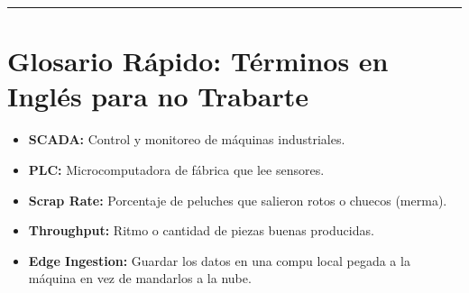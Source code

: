 \documentclass[10pt,letterpaper]{article}
\begin{document}
\vspace{0.2cm}
\rule{\textwidth}{0.8pt}

\section*{Glosario Rápido: Términos en Inglés para no Trabarte}
\begin{itemize}[leftmargin=*]
    \item \textbf{SCADA:} Control y monitoreo de máquinas industriales.
    \item \textbf{PLC:} Microcomputadora de fábrica que lee sensores.
    \item \textbf{Scrap Rate:} Porcentaje de peluches que salieron rotos o chuecos (merma).
    \item \textbf{Throughput:} Ritmo o cantidad de piezas buenas producidas.
    \item \textbf{Edge Ingestion:} Guardar los datos en una compu local pegada a la máquina en vez de mandarlos a la nube.
\end{itemize}
\end{document}
